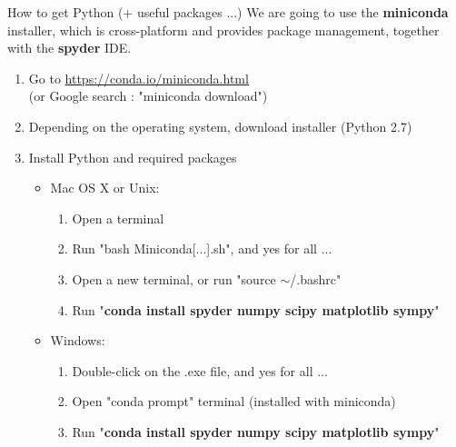 \documentclass[11pt,unknownkeysallowed,usenames,dvipsnames]{beamer}
\begin{document}
   	\begin{frame}{How to get Python (+ useful packages ...)}
           We are going to use the \textbf{miniconda} installer, which is cross-platform and provides package management, together with the \textbf{spyder} IDE.
           
           \begin{enumerate}
               \item Go to \href{https://conda.io/miniconda.html}{https://conda.io/miniconda.html} \\ (or Google search : "miniconda download")
               \item Depending on the operating system, download installer (Python 2.7)
               \item Install Python and required packages
               \begin{itemize}
                   \item Mac OS X or Unix:
                   \begin{enumerate}
                       \item Open a terminal
                       \item Run "bash Miniconda[...].sh", and yes for all ...
                       \item Open a new terminal, or run "source $\sim$/.bashrc"
                       \item Run "\textbf{conda install spyder numpy scipy matplotlib sympy}"
                    \end{enumerate}
                    \item Windows:
                    \begin{enumerate}
                        \item Double-click on the .exe file, and yes for all ...
                        \item Open "conda prompt" terminal (installed with miniconda)
                        \item Run "\textbf{conda install spyder numpy scipy matplotlib sympy}"
                    \end{enumerate}
                \end{itemize}
            \end{enumerate}
        \end{frame}
        
\end{document}
